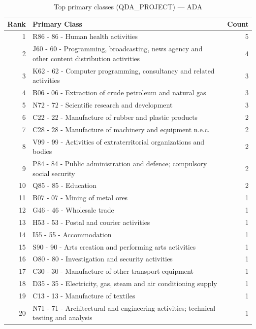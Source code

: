 \begin{table}[H]
    \centering
    \begin{tabular}{r p{10cm} r}
    \hline
    \textbf{Rank} & \textbf{Primary Class} & \textbf{Count} \\
    \hline
    1 & R86 - 86 - Human health activities & 5 \\
    2 & J60 - 60 - Programming, broadcasting, news agency and other content distribution activities & 4 \\
    3 & K62 - 62 - Computer programming, consultancy and related activities & 3 \\
    4 & B06 - 06 - Extraction of crude petroleum and natural gas & 3 \\
    5 & N72 - 72 - Scientific research and development & 3 \\
    6 & C22 - 22 - Manufacture of rubber and plastic products & 2 \\
    7 & C28 - 28 - Manufacture of machinery and equipment n.e.c. & 2 \\
    8 & V99 - 99 - Activities of extraterritorial organizations and bodies & 2 \\
    9 & P84 - 84 - Public administration and defence; compulsory social security & 2 \\
    10 & Q85 - 85 - Education & 2 \\
    11 & B07 - 07 - Mining of metal ores & 1 \\
    12 & G46 - 46 - Wholesale trade & 1 \\
    13 & H53 - 53 - Postal and courier activities & 1 \\
    14 & I55 - 55 - Accommodation & 1 \\
    15 & S90 - 90 - Arts creation and performing arts activities & 1 \\
    16 & O80 - 80 - Investigation and security activities & 1 \\
    17 & C30 - 30 - Manufacture of other transport equipment & 1 \\
    18 & D35 - 35 - Electricity, gas, steam and air conditioning supply & 1 \\
    19 & C13 - 13 - Manufacture of textiles & 1 \\
    20 & N71 - 71 - Architectural and engineering activities; technical testing and analysis & 1 \\
    \hline
    \end{tabular}
    \caption{Top primary classes (QDA\_PROJECT) --- ADA}
\end{table}

